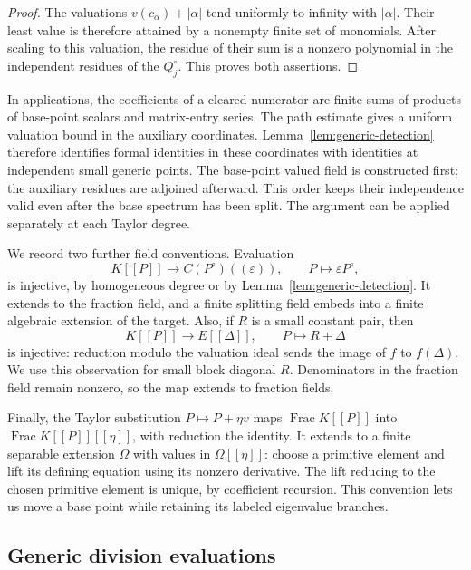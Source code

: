\begin{proof}
The valuations $v(c_\alpha)+|\alpha|$ tend uniformly to infinity
with $|\alpha|$.  Their least value is therefore attained by a
nonempty finite set of monomials.  After scaling to this valuation,
the residue of their sum is a nonzero polynomial in the independent
residues of the $Q_j^\circ$.  This proves both assertions.
\end{proof}

In applications, the coefficients of a cleared numerator are finite
sums of products of base-point scalars and matrix-entry series.
The path estimate gives a uniform valuation bound in the auxiliary
coordinates.  Lemma~\ref{lem:generic-detection} therefore identifies
formal identities in these coordinates with identities at independent
small generic points.  The base-point valued field is constructed
first; the auxiliary residues are adjoined afterward.  This order
keeps their independence valid even after the base spectrum has been
split.  The argument can be applied separately at each Taylor degree.

We record two further field conventions.  Evaluation
\[
 K[[P]]\longrightarrow C(P^\circ)((\varepsilon)),
 \qquad P\longmapsto\varepsilon P^\circ,
\]
is injective, by homogeneous degree or by
Lemma~\ref{lem:generic-detection}.  It extends to the fraction field,
and a finite splitting field embeds into a finite algebraic extension
of the target.  Also, if $R$ is a small constant pair, then
\begin{equation}
K[[P]]\longrightarrow E[[\Delta]],\qquad P\longmapsto R+\Delta
 \label{eq:generic-taylor-embedding}
\end{equation}
is injective: reduction modulo the valuation ideal sends the image of
$f$ to $f(\Delta)$.  We use this observation for small block diagonal
$R$.  Denominators in the fraction field remain nonzero, so the map
extends to fraction fields.

Finally, the Taylor substitution $P\mapsto P+\eta v$ maps
$\operatorname{Frac}K[[P]]$ into
$\operatorname{Frac}K[[P]][[\eta]]$, with reduction the identity.
It extends to a finite separable extension $\Omega$ with values in
$\Omega[[\eta]]$: choose a primitive element and lift its defining
equation using its nonzero derivative.  The lift reducing to the
chosen primitive element is unique, by coefficient recursion.  This
convention lets us move a base point while retaining its labeled
eigenvalue branches.

\subsection{Generic division evaluations}\label{subsec:generic-division}

